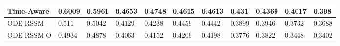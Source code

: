 \begin{table}
{\begin{tabular}{l|ll|ll|ll|ll|ll}
Time-Aware            & 0.6009	&   0.5961                   & 0.4653	&   0.4748                 & 0.4615	&   0.4613                    & 0.431	&   0.4369                 & 0.4017	&   0.398            \\ 
\hline
ODE-RSSM              & 0.511  & 0.5042                   & 0.4129 & 0.4238                 & 0.4459 & 0.4442                   & 0.3899 & 0.3946                 & \cellcolor{Green!30} 0.3732 & \cellcolor{Green!30} 0.3688            \\
ODE-RSSM-O            & \cellcolor{Green!60} 0.4934 & \cellcolor{Green!60} 0.4878                   & \cellcolor{Green!30} 0.4063 & \cellcolor{Green!30} 0.4152                 & \cellcolor{Green!60} 0.4209 & \cellcolor{Green!60} 0.4198                   & \cellcolor{Green!60} 0.3776 & \cellcolor{Green!60} 0.3822                 & \cellcolor{Green!60} 0.3448 & \cellcolor{Green!60} 0.3402            \\
\bottomrule
\end{tabular}}
\label{tab:winding}
\end{table}


